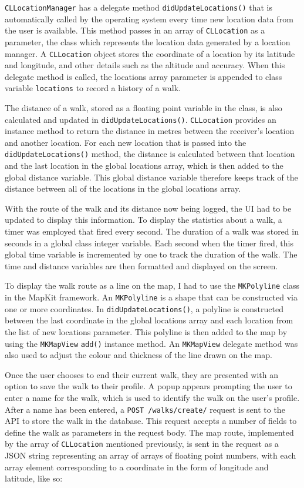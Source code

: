 \verb|CLLocationManager| has a delegate method \verb|didUpdateLocations()| that is automatically called by the operating system every time new location data from the user is available. This method passes in an array of \verb|CLLocation| as a parameter, the class which represents the location data generated by a location manager. A \verb|CLLocation| object stores the coordinate of a location by its latitude and longitude, and other details such as the altitude and accuracy. When this delegate method is called, the locations array parameter is appended to class variable \verb|locations| to record a history of a walk.

The distance of a walk, stored as a floating point variable in the class, is also calculated and updated in \verb|didUpdateLocations()|. \verb|CLLocation| provides an instance method to return the distance in metres between the receiver's location and another location. For each new location that is passed into the \verb|didUpdateLocations()| method, the distance is calculated between that location and the last location in the global locations array, which is then added to the global distance variable. This global distance variable therefore keeps track of the distance between all of the locations in the global locations array.

With the route of the walk and its distance now being logged, the UI had to be updated to display this information. To display the statistics about a walk, a timer was employed that fired every second. The duration of a walk was stored in seconds in a global class integer variable. Each second when the timer fired, this global time variable is incremented by one to track the duration of the walk. The time and distance variables are then formatted and displayed on the screen.

To display the walk route as a line on the map, I had to use the \verb|MKPolyline| class in the MapKit framework. An \verb|MKPolyline| is a shape that can be constructed via one or more coordinates. In \verb|didUpdateLocations()|, a polyline is constructed between the last coordinate in the global locations array and each location from the list of new locations parameter. This polyline is then added to the map by using the \verb|MKMapView| \verb|add()| instance method. An \verb|MKMapView| delegate method was also used to adjust the colour and thickness of the line drawn on the map.


Once the user chooses to end their current walk, they are presented with an option to save the walk to their profile. A popup appears prompting the user to enter a name for the walk, which is used to identify the walk on the user's profile. After a name has been entered, a \verb|POST /walks/create/| request is sent to the API to store the walk in the database. This request accepts a number of fields to define the walk as parameters in the request body. The map route, implemented by the array of \verb|CLLocation| mentioned previously, is sent in the request as a JSON string representing an array of arrays of floating point numbers, with each array element corresponding to a coordinate in the form of longitude and latitude, like so:

